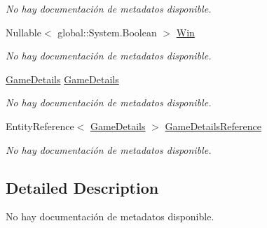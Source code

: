 \begin{DoxyCompactItemize}
\begin{DoxyCompactList}\small\item\em No hay documentación de metadatos disponible. \end{DoxyCompactList}\item 
Nullable$<$ global\-::\-System.\-Boolean $>$ \hyperlink{class_microsoft_1_1_samples_1_1_kinect_1_1_basic_interactions_1_1_game_detail_interactions_a11f4d18a314835a8196d1d6a468f290b}{Win}
\begin{DoxyCompactList}\small\item\em No hay documentación de metadatos disponible. \end{DoxyCompactList}\item 
\hyperlink{class_microsoft_1_1_samples_1_1_kinect_1_1_basic_interactions_1_1_game_details}{Game\-Details} \hyperlink{class_microsoft_1_1_samples_1_1_kinect_1_1_basic_interactions_1_1_game_detail_interactions_a57c9d8c6c0aa3803ea8bc42f8a1d3a7c}{Game\-Details}
\begin{DoxyCompactList}\small\item\em No hay documentación de metadatos disponible. \end{DoxyCompactList}\item 
Entity\-Reference$<$ \hyperlink{class_microsoft_1_1_samples_1_1_kinect_1_1_basic_interactions_1_1_game_details}{Game\-Details} $>$ \hyperlink{class_microsoft_1_1_samples_1_1_kinect_1_1_basic_interactions_1_1_game_detail_interactions_af2558b69c9d50b068aa5e8102ded8cf0}{Game\-Details\-Reference}
\begin{DoxyCompactList}\small\item\em No hay documentación de metadatos disponible. \end{DoxyCompactList}\end{DoxyCompactItemize}


\subsection{Detailed Description}
No hay documentación de metadatos disponible. 



